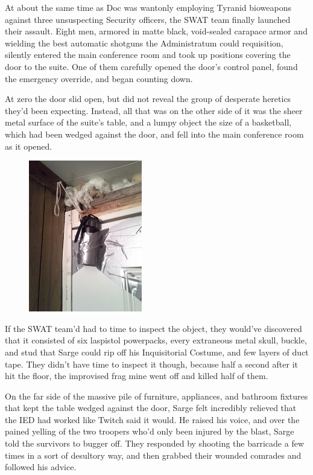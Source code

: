 At about the same time as Doc was wantonly employing Tyranid bioweapons against three unsuspecting Security officers, the SWAT team finally launched their assault. 
Eight men, armored in matte black, void-sealed carapace armor and wielding the best automatic shotguns the Administratum could requisition, silently entered the main conference room and took up positions covering the door to the suite. 
One of them carefully opened the door's control panel, found the emergency override, and began counting down.

At zero the door slid open, but did not reveal the group of desperate heretics they'd been expecting. 
Instead, all that was on the other side of it was the sheer metal surface of the suite's table, and a lumpy object the size of a basketball, which had been wedged against the door, and fell into the main conference room as it opened.

\begin{figure}
	\begin{center}
		\includegraphics[width=\figwidth]{pics/14/39.png}
	\end{center}
\end{figure}
If the SWAT team'd had to time to inspect the object, they would've discovered that it consisted of six laspistol powerpacks, every extraneous metal skull, buckle, and stud that Sarge could rip off his Inquisitorial Costume, and few layers of duct tape. 
They didn't have time to inspect it though, because half a second after it hit the floor, the improvised frag mine went off and killed half of them.

On the far side of the massive pile of furniture, appliances, and bathroom fixtures that kept the table wedged against the door, Sarge felt incredibly relieved that the IED had worked like Twitch said it would. 
He raised his voice, and over the pained yelling of the two troopers who'd only been injured by the blast, Sarge told the survivors to bugger off. 
They responded by shooting the barricade a few times in a sort of desultory way, and then grabbed their wounded comrades and followed his advice.

